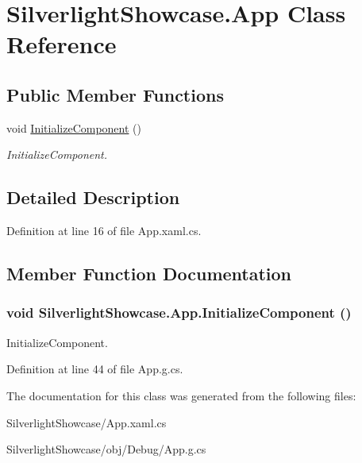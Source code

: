 \hypertarget{class_silverlight_showcase_1_1_app}{
\section{SilverlightShowcase.App Class Reference}
\label{class_silverlight_showcase_1_1_app}
}
\subsection*{Public Member Functions}
\begin{DoxyCompactItemize}
\item 
void \hyperlink{class_silverlight_showcase_1_1_app_a17a466874d874ac98e6e7ac337fa5230}{InitializeComponent} ()
\begin{DoxyCompactList}\small\item\em InitializeComponent. \item\end{DoxyCompactList}\end{DoxyCompactItemize}


\subsection{Detailed Description}


Definition at line 16 of file App.xaml.cs.

\subsection{Member Function Documentation}
\hypertarget{class_silverlight_showcase_1_1_app_a17a466874d874ac98e6e7ac337fa5230}{
\subsubsection[{InitializeComponent}]{\setlength{\rightskip}{0pt plus 5cm}void SilverlightShowcase.App.InitializeComponent ()}}
\label{class_silverlight_showcase_1_1_app_a17a466874d874ac98e6e7ac337fa5230}


InitializeComponent. 

Definition at line 44 of file App.g.cs.

The documentation for this class was generated from the following files:\begin{DoxyCompactItemize}
\item 
SilverlightShowcase/App.xaml.cs\item 
SilverlightShowcase/obj/Debug/App.g.cs\end{DoxyCompactItemize}
